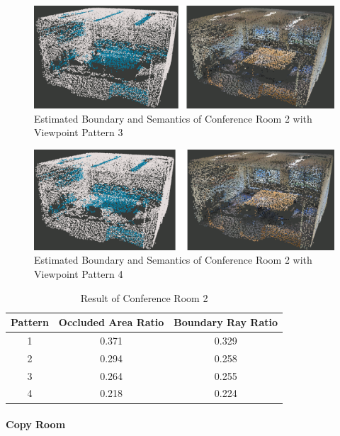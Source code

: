 \documentclass[11pt, a4paper,oneside,chapterprefix=false]{scrbook}
\begin{document}
\begin{figure}[H]
    \centering
    \includegraphics*[width=1.0\textwidth]{figures/conf2 5.png}
    \caption{Estimated Boundary and Semantics of Conference Room 2 with Viewpoint Pattern 3}
    \label{fig:conf2 5}
\end{figure}

\begin{figure}[H]
    \centering
    \includegraphics*[width=1.0\textwidth]{figures/conf2 6.png}
    \caption{Estimated Boundary and Semantics of Conference Room 2 with Viewpoint Pattern 4}
    \label{fig:conf2 6}
\end{figure}

\begin{table}[H]
    \centering
    \begin{tabular}{|c|c|c|}
        \hline
        \textbf{Pattern} & \textbf{Occluded Area Ratio} & \textbf{Boundary Ray Ratio} \\
        \hline
        1 & 0.371 & 0.329 \\
        2 & 0.294 & 0.258 \\
		3 & 0.264 & 0.255 \\
		4 & 0.218 & 0.224 \\
        \hline
    \end{tabular}
    \caption{Result of Conference Room 2}
    \label{tab:result of conference room 2}
\end{table}

\paragraph{Copy Room}
\end{document}
